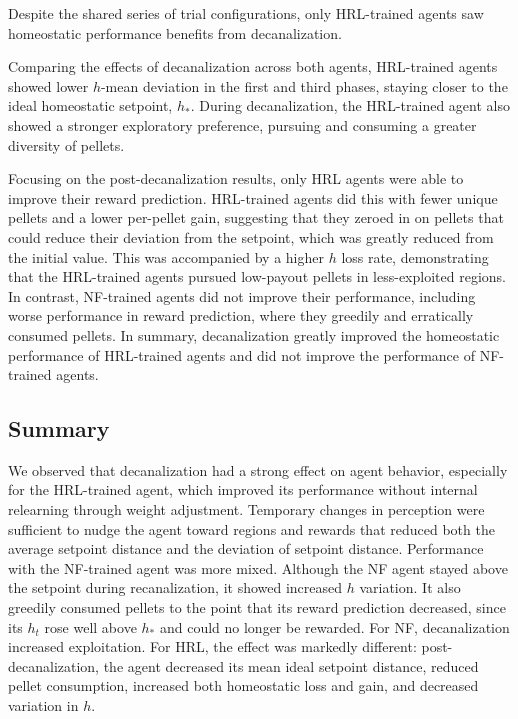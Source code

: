 Despite the shared series of trial configurations, only HRL-trained agents saw homeostatic performance benefits from decanalization.

Comparing the effects of decanalization across both agents, HRL-trained agents showed lower \(h\)-mean deviation in the first and third phases, staying closer to the ideal homeostatic setpoint, \(h_*\). During decanalization, the HRL-trained agent also showed a stronger exploratory preference, pursuing and consuming a greater diversity of pellets.

Focusing on the post-decanalization results, only HRL agents were able to improve their reward prediction. HRL-trained agents did this with fewer unique pellets and a lower per-pellet gain, suggesting that they zeroed in on pellets that could reduce their deviation from the setpoint, which was greatly reduced from the initial value. This was accompanied by a higher \(h\) loss rate, demonstrating that the HRL-trained agents pursued low-payout pellets in less-exploited regions. In contrast, NF-trained agents did not improve their performance, including worse performance in reward prediction, where they greedily and erratically consumed pellets. In summary, decanalization greatly improved the homeostatic performance of HRL-trained agents and did not improve the performance of NF-trained agents.

\subsection{Summary}

We observed that decanalization had a strong effect on agent behavior, especially for the HRL-trained agent, which improved its performance without internal relearning through weight adjustment. Temporary changes in perception were sufficient to nudge the agent toward regions and rewards that reduced both the average setpoint distance and the deviation of setpoint distance. Performance with the NF-trained agent was more mixed. Although the NF agent stayed above the setpoint during recanalization, it showed increased \(h\) variation. It also greedily consumed pellets to the point that its reward prediction decreased, since its \(h_t\) rose well above \(h_*\) and could no longer be rewarded. For NF, decanalization increased exploitation. For HRL, the effect was markedly different: post-decanalization, the agent decreased its mean ideal setpoint distance, reduced pellet consumption, increased both homeostatic loss and gain, and decreased variation in \(h\).

